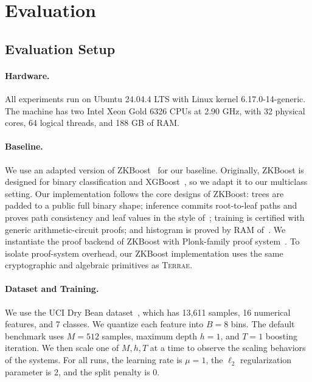 \section{Evaluation}\label{sec:evaluation}

\subsection{Evaluation Setup}\label{subsec:eval-setup}

\paragraph{Hardware.}
All experiments run on Ubuntu 24.04.4 LTS with Linux kernel
6.17.0-14-generic.  The machine has two Intel Xeon Gold 6326 CPUs at
2.90 GHz, with 32 physical cores, 64 logical threads, and 188 GB of RAM.

\paragraph{Baseline.}
We use an adapted version of ZKBoost~\cite{zkboost26} for our baseline.
Originally, ZKBoost is designed for binary classification and XGBoost~\cite{xgboost16}, so we adapt it to our multiclass setting.
Our implementation 
follows the core designs of ZKBoost: trees are padded to a public full binary
shape; inference commits root-to-leaf paths and proves path consistency and
leaf values in the style of~\cite{zkdt20}; training is certified with
generic arithmetic-circuit proofs;
and histogram is proved by RAM of~\cite{twoshuffleRAM24}.
We instantiate the proof backend of ZKBoost with Plonk-family proof system~\cite{plonk19, plookup20}.
To isolate proof-system overhead, our
ZKBoost implementation uses the same cryptographic and algebraic primitives as
\textsc{Terrae}.

\paragraph{Dataset and Training.}
We use the UCI Dry Bean dataset~\cite{drybeans20}, which has 13,611 samples,
16 numerical features, and 7 classes.  We quantize each feature into $B=8$
bins.  The default benchmark uses $M=512$ samples, maximum depth $h=1$, and
$T=1$ boosting iteration.
We then scale one of $M,h,T$ at a time to observe the scaling behaviors of the systems.  For all
runs, the learning rate is $\mu=1$, the $\ell_2$ regularization parameter is
2, and the split penalty is 0.

